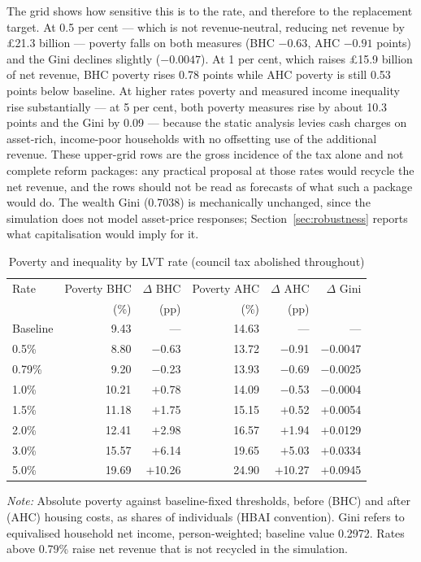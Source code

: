 The grid shows how sensitive this is to the rate, and therefore to the replacement target. At 0.5 per cent --- which is not revenue-neutral, reducing net revenue by \pounds 21.3 billion --- poverty falls on both measures (BHC $-0.63$, AHC $-0.91$ points) and the Gini declines slightly ($-0.0047$). At 1 per cent, which raises \pounds 15.9 billion of net revenue, BHC poverty rises 0.78 points while AHC poverty is still 0.53 points below baseline. At higher rates poverty and measured income inequality rise substantially --- at 5 per cent, both poverty measures rise by about 10.3 points and the Gini by 0.09 --- because the static analysis levies cash charges on asset-rich, income-poor households with no offsetting use of the additional revenue. These upper-grid rows are the gross incidence of the tax alone and not complete reform packages: any practical proposal at those rates would recycle the net revenue, and the rows should not be read as forecasts of what such a package would do. The wealth Gini (0.7038) is mechanically unchanged, since the simulation does not model asset-price responses; Section~\ref{sec:robustness} reports what capitalisation would imply for it.

\begin{table}[htbp]
\centering
\caption{Poverty and inequality by LVT rate (council tax abolished throughout)}
\label{tab:poverty}
\begin{tabular}{lrrrrr}
\toprule
Rate & Poverty BHC & $\Delta$ BHC & Poverty AHC & $\Delta$ AHC & $\Delta$ Gini \\
     & (\%) & (pp) & (\%) & (pp) & \\
\midrule
Baseline & 9.43  & ---      & 14.63 & ---      & --- \\
0.5\%    & 8.80  & $-$0.63  & 13.72 & $-$0.91  & $-$0.0047 \\
0.79\%   & 9.20  & $-$0.23  & 13.93 & $-$0.69  & $-$0.0025 \\
1.0\%    & 10.21 & $+$0.78  & 14.09 & $-$0.53  & $-$0.0004 \\
1.5\%    & 11.18 & $+$1.75  & 15.15 & $+$0.52  & $+$0.0054 \\
2.0\%    & 12.41 & $+$2.98  & 16.57 & $+$1.94  & $+$0.0129 \\
3.0\%    & 15.57 & $+$6.14  & 19.65 & $+$5.03  & $+$0.0334 \\
5.0\%    & 19.69 & $+$10.26 & 24.90 & $+$10.27 & $+$0.0945 \\
\bottomrule
\end{tabular}

\medskip
{\footnotesize\emph{Note:} Absolute poverty against baseline-fixed thresholds, before (BHC) and after (AHC) housing costs, as shares of individuals (HBAI convention). Gini refers to equivalised household net income, person-weighted; baseline value 0.2972. Rates above 0.79\% raise net revenue that is not recycled in the simulation.}
\end{table}

